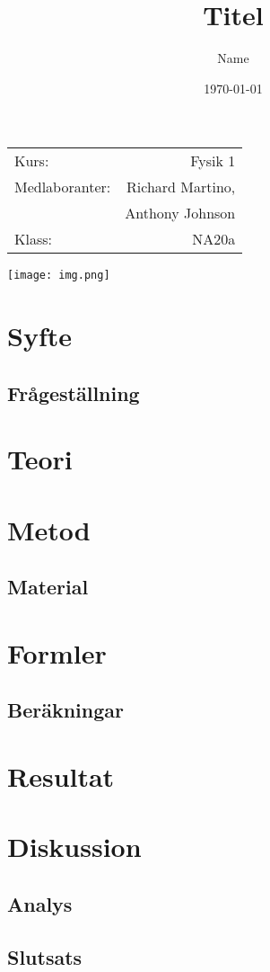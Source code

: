 \documentclass[a4paper]{article}
\title{Titel}
\author{Name}
\date{\today}
\begin{document}
\maketitle
\begin{center}
	\begin{tabular}{ lr }
		Kurs: & Fysik 1 \\
		Medlaboranter: & Richard Martino, \\
		& Anthony Johnson \\
		Klass: & NA20a \\
	\end{tabular}
	\texttt{[image: img.png]}
\end{center}

\newpage
\tableofcontents
\newpage

\section{Syfte}
\subsection{Frågeställning}
\section{Teori}
\section{Metod}
\subsection{Material}
\section{Formler}
\subsection{Beräkningar}
\section{Resultat}
\section{Diskussion}
\subsection{Analys}
\subsection{Slutsats}
\end{document}
